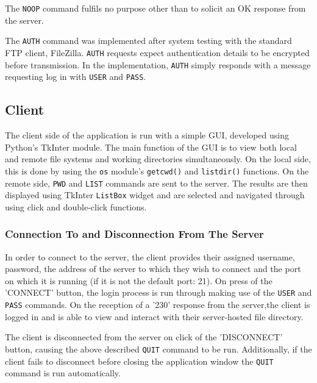 \documentclass[10pt,twocolumn]{witseiepaper}
\begin{document}
The \texttt{NOOP} command fulfils no purpose other than to solicit an OK response from the server.

The \texttt{AUTH} command was implemented after system testing with the standard FTP client, FileZilla. \texttt{AUTH} requests expect authentication details to be encrypted before transmission. In the implementation, \texttt{AUTH} simply responds with a message requesting log in with \texttt{USER} and \texttt{PASS}.


\subsection{Client}



The client side of the application is run with a simple GUI, developed using Python's TkInter module. The main function of the GUI is to view both local and remote file systems and working directories simultaneously. On the local side, this is done by using the \texttt{os} module's \texttt{getcwd()} and \texttt{listdir()} functions. On the remote side, \texttt{PWD} and \texttt{LIST} commands are sent to the server. The results are then displayed using TkInter \texttt{ListBox} widget and are selected and navigated through using click and double-click functions.

\subsubsection*{Connection To and Disconnection From The  Server}
In order to connect to the server, the client provides their assigned username, password, the address of the server to which they wish to connect and the port on which it is running (if it is not the default port: 21). On press of the 'CONNECT' button, the login process is run through making use of the \texttt{USER} and \texttt{PASS} commands. On the reception of a '230' response from the server,the client is logged in and is able to view and interact with their server-hosted file directory.
 
The client is disconnected from the server on click of the 'DISCONNECT' button, causing the above described \texttt{QUIT} command to be run. Additionally, if the client fails to disconnect before closing the application window the \texttt{QUIT} command is run automatically.
\end{document}
